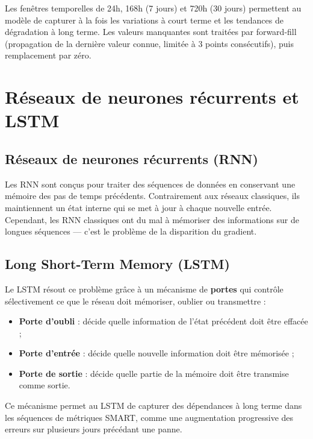 Les fenêtres temporelles de 24h, 168h (7 jours) et 720h (30 jours) permettent au
modèle de capturer à la fois les variations à court terme et les tendances de
dégradation à long terme. Les valeurs manquantes sont traitées par forward-fill
(propagation de la dernière valeur connue, limitée à 3 points consécutifs), puis
remplacement par zéro.

\section{Réseaux de neurones récurrents et LSTM}

\subsection{Réseaux de neurones récurrents (RNN)}

Les RNN sont conçus pour traiter des séquences de données en conservant une
mémoire des pas de temps précédents. Contrairement aux réseaux classiques, ils
maintiennent un état interne qui se met à jour à chaque nouvelle entrée. Cependant,
les RNN classiques ont du mal à mémoriser des informations sur de longues séquences
— c'est le problème de la disparition du gradient.

\subsection{Long Short-Term Memory (LSTM)}

Le LSTM \cite{hochreiter1997lstm} résout ce problème grâce à un mécanisme de
\textbf{portes} qui contrôle sélectivement ce que le réseau doit mémoriser, oublier
ou transmettre :

\begin{itemize}
  \item \textbf{Porte d'oubli} : décide quelle information de l'état précédent
        doit être effacée ;
  \item \textbf{Porte d'entrée} : décide quelle nouvelle information doit être
        mémorisée ;
  \item \textbf{Porte de sortie} : décide quelle partie de la mémoire doit être
        transmise comme sortie.
\end{itemize}

Ce mécanisme permet au LSTM de capturer des dépendances à long terme dans les
séquences de métriques SMART, comme une augmentation progressive des erreurs sur
plusieurs jours précédant une panne.


